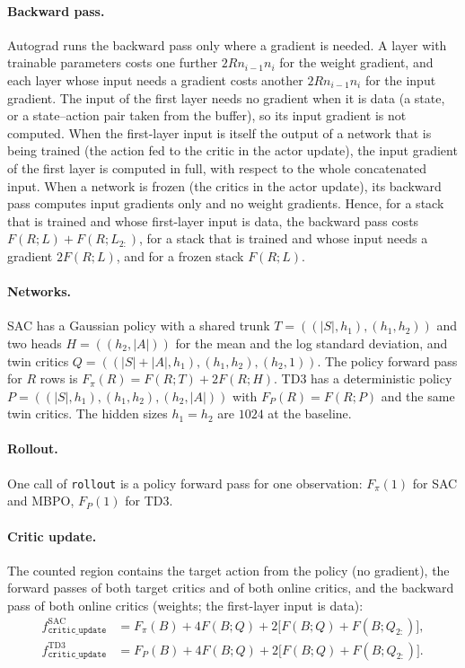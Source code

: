 \paragraph{Backward pass.} Autograd runs the backward pass only where a gradient is needed.
A layer with trainable parameters costs one further $2Rn_{i-1}n_i$ for the weight gradient, and each layer whose input needs a gradient costs another $2Rn_{i-1}n_i$ for the input gradient.
The input of the first layer needs no gradient when it is data (a state, or a state--action pair taken from the buffer), so its input gradient is not computed.
When the first-layer input is itself the output of a network that is being trained (the action fed to the critic in the actor update), the input gradient of the first layer is computed in full, with respect to the whole concatenated input.
When a network is frozen (the critics in the actor update), its backward pass computes input gradients only and no weight gradients.
Hence, for a stack that is trained and whose first-layer input is data, the backward pass costs $F(R;L)+F(R;L_{2:})$, for a stack that is trained and whose input needs a gradient $2F(R;L)$, and for a frozen stack $F(R;L)$.

\paragraph{Networks.} SAC has a Gaussian policy with a shared trunk $T=((|S|,h_1),(h_1,h_2))$ and two heads $H=((h_2,|A|))$ for the mean and the log standard deviation, and twin critics $Q=((|S|+|A|,h_1),(h_1,h_2),(h_2,1))$.
The policy forward pass for $R$ rows is $F_\pi(R)=F(R;T)+2F(R;H)$.
TD3 has a deterministic policy $P=((|S|,h_1),(h_1,h_2),(h_2,|A|))$ with $F_P(R)=F(R;P)$ and the same twin critics.
The hidden sizes $h_1=h_2$ are $1024$ at the baseline.

\paragraph{Rollout.} One call of \texttt{rollout} is a policy forward pass for one observation: $F_\pi(1)$ for SAC and MBPO, $F_P(1)$ for TD3.

\paragraph{Critic update.} The counted region contains the target action from the policy (no gradient), the forward passes of both target critics and of both online critics, and the backward pass of both online critics (weights; the first-layer input is data):
\begin{align}
  f_{\texttt{critic\_update}}^{\mathrm{SAC}} &= F_\pi(B) + 4F(B;Q) + 2\bigl[F(B;Q)+F(B;Q_{2:})\bigr] ,\label{eq:app-critic-sac}\\
  f_{\texttt{critic\_update}}^{\mathrm{TD3}} &= F_P(B) + 4F(B;Q) + 2\bigl[F(B;Q)+F(B;Q_{2:})\bigr] .\label{eq:app-critic-td3}
\end{align}

